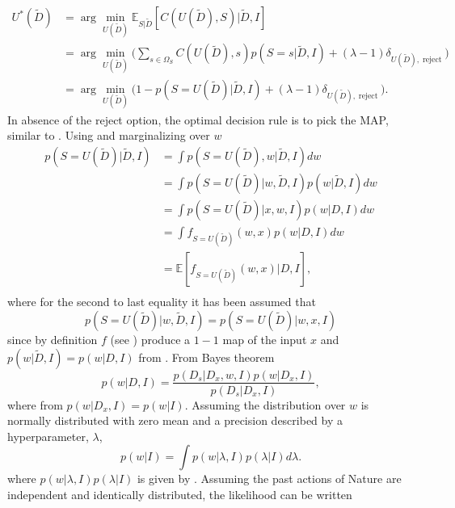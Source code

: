 \begin{equation}
	\begin{split}
		U^*(\tilde{D}) & = \arg\min_{U(\tilde{D})}\mathbb{E}_{S|\tilde{D}}[C(U(\tilde{D}), S)|\tilde{D},I]\\
		&= \arg\min_{U(\tilde{D})}\bigg(\sum_{s\in \Omega_S}C(U(\tilde{D}),s)p(S = s|\tilde{D},I)+(\lambda-1)\delta_{U(\tilde{D}),\operatorname{reject}}\bigg)\\
		& = \arg\min_{U(\tilde{D})}\bigg(1- p(S=U(\tilde{D})|\tilde{D},I)+(\lambda-1)\delta_{U(\tilde{D}),\operatorname{reject}}\bigg).
	\end{split}
	\label{eq:expected_cost1}
\end{equation}
In absence of the reject option, the optimal decision rule is to pick the MAP, similar to . Using  and marginalizing over $w$
\begin{equation}
	\begin{split}
		p(S= U(\tilde{D})|\tilde{D},I) &= \int p(S = U(\tilde{D}),w|\tilde{D},I) dw \\
		& = \int p(S = U(\tilde{D})|w,\tilde{D},I)  p(w|\tilde{D},I)dw \\
		& = \int p(S = U(\tilde{D})|x,w,I)  p(w|D,I)dw \\
		& = \int f_{S = U(\tilde{D})}(w,x)  p(w|D,I)dw \\
		& = \mathbb{E}[f_{S = U(\tilde{D})}(w,x)|D,I],\\
	\end{split}
	\label{eq:q5}
\end{equation}
where for the second to last equality it has been assumed that
\begin{equation}
	p(S = U(\tilde{D})|w,\tilde{D},I) = p(S = U(\tilde{D})|w,x,I)
\end{equation}
since by definition $f$ (see ) produce a $1-1$ map of the input $x$ and $p(w|\tilde{D},I) = p(w|D,I)$ from . From Bayes theorem
\begin{equation}
	p(w|D,I) =\frac{p(D_s|D_x,w,I)p(w|D_x,I)}{p(D_s|D_x,I)},
\end{equation}
where from  $p(w|D_x,I) = p(w|I)$. Assuming the distribution over $w$ is normally distributed with zero mean and a precision described by a hyperparameter, $\lambda$, 
\begin{equation}
	p(w|I) = \int p(w|\lambda,I)p(\lambda|I)d\lambda.
\end{equation}
where $p(w|\lambda,I)p(\lambda|I)$ is given by . Assuming the past actions of Nature are independent and identically distributed, the likelihood can be written~\citep{Fischer1999} 
